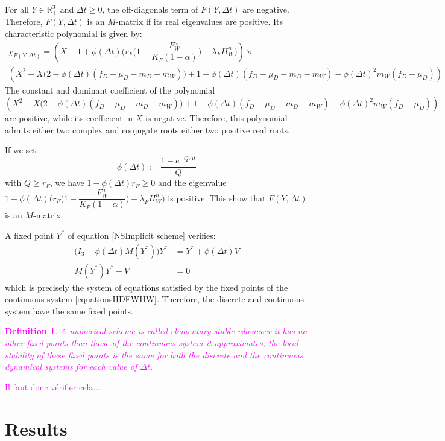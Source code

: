 \documentclass{article}
\newcommand{\lfw}{\lambda_{F}}
\newcommand{\lfw}{\lambda_{F}}
\newcommand{\YD}[1]{\textcolor{magenta}{#1}}
\newtheorem{definition}{Definition}
\begin{document}
For all $Y \in \mathbb{R}^3_+$ and $\Delta t \geq 0$, the off-diagonals term of $F(Y, \Delta t)$ are negative. Therefore, $F(Y, \Delta t)$ is an $M$-matrix if its real eigenvalues are positive. Its characteristic polynomial is given by:
\begin{multline}
\chi_{F(Y, \Delta t)} = \left(X - 1 + \phi(\Delta t) \Big(r_F\Big(1 - \dfrac{F_W^n}{K_F(1 - \alpha)} \Big) - \lfw H_W^n \Big)\right) \times \\
\left(X^2 - X \Big(2 - \phi(\Delta t) (f_D - \mu_D - m_D - m_W) \Big) + 1 - \phi(\Delta t) (f_D - \mu_D - m_D - m_W) - \phi(\Delta t)^2 m_W ( f_D - \mu_D) \right)
\end{multline}
The constant and dominant coefficient of the polynomial $$\left(X^2 - X \Big(2 - \phi(\Delta t) (f_D - \mu_D - m_D - m_W) \Big) + 1 - \phi(\Delta t) (f_D - \mu_D - m_D - m_W) - \phi(\Delta t)^2 m_W ( f_D - \mu_D) \right)$$ are positive, while its coefficient in $X$ is negative. Therefore, this polynomial admits either two complex and conjugate roots either two positive real roots.

If we set
\begin{equation}
\phi(\Delta t) := \dfrac{1 - e^{-Q \Delta t}}{Q}
\end{equation}
with $Q \geq r_F$, we have $1 - \phi(\Delta t)r_F \geq 0$ and the eigenvalue $1 - \phi(\Delta t) \Big(r_F\Big(1 - \dfrac{F_W^n}{K_F(1 - \alpha)} \Big) - \lfw H_W^n \Big)$ is positive. This show that $F(Y, \Delta t)$ is an $M$-matrix.

\medskip
A fixed point $Y^*$ of equation \eqref{NSImplicit scheme} verifies:
\begin{align*}
\Big(I_3 - \phi(\Delta t) M(Y^*) \Big) Y^* &= Y^* + \phi(\Delta t)V \\
 M(Y^*) Y^* + V&= 0
\end{align*}
which is precisely the system of equations satisfied by the fixed points of the continuous system \eqref{equationsHDFWHW}. Therefore, the discrete and continuous system have the same fixed points.

\YD{
\begin{definition}
A numerical scheme is called elementary stable whenever it has no other fixed points than those of the continuous system it approximates, the local stability of these fixed points is the same for both the discrete and the continuous dynamical systems for each value of $\Delta t$.
\end{definition}
Il faut donc vérifier cela....
}
\section{Results}



\end{document}
